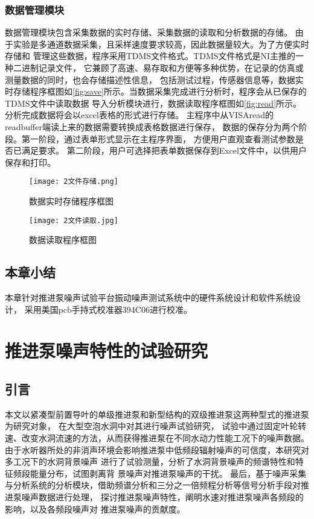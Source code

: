 \subsection{数据管理模块}
数据管理模块包含采集数据的实时存储、采集数据的读取和分析数据的存储。
由于实验是多通道数据采集，且采样速度要求较高，因此数据量较大。为了方便实时存储和
管理这些数据，程序采用TDMS文件格式。TDMS文件格式是NI主推的一种二进制记录文件，
它兼顾了高速、易存取和方便等多种优势，在记录的仿真或测量数据的同时，也会存储描述性信息，
包括测试过程，传感器信息等，数据实时存储程序框图如\autoref{fig:save}所示。当数据采集完成进行分析时，程序会从已保存的TDMS文件中读取数据
导入分析模块进行，数据读取程序框图如\autoref{fig:read}所示。分析完成数据将会以excel表格的形式进行存储。
主程序中从VISAread的readbuffer端读上来的数据需要转换成表格数据进行保存，
数据的保存分为两个阶段。第一阶段，通过表单形式显示在主程序界面，
方便用户直观查看测试参数是否已满足要求。
第二阶段，用户可选择把表单数据保存到Excel文件中，以供用户保存和打印。
\begin{figure}[htbp]
    \centering
    \texttt{[image: 2文件存储.png]}
    \caption{\label{fig:save}数据实时存储程序框图}
\end{figure}
\begin{figure}[htbp]
    \centering
    \texttt{[image: 2文件读取.jpg]}
    \caption{\label{fig:read}数据读取程序框图}
\end{figure}
\section{本章小结}
本章针对推进泵噪声试验平台振动噪声测试系统中的硬件系统设计和软件系统设计，
采用美国pcb手持式校准器394C06进行校准。

\chapter{推进泵噪声特性的试验研究}\label{ch:chapter3}
\section{引言}
本文以紧凑型前置导叶的单级推进泵和新型结构的双级推进泵这两种型式的推进泵为研究对象，
在大型空泡水洞中对其进行噪声试验研究，
试验中通过固定叶轮转速、改变水洞流速的方法，从而获得推进泵在不同水动力性能工况下的噪声数据。
由于水听器所处的非消声环境会影响推进泵中低频段辐射噪声的可信度，本研究对多工况下的水洞背景噪声
进行了试验测量，分析了水洞背景噪声的频谱特性和特征频段能量分布，试图剥离背
景噪声对推进泵噪声的干扰。
最后，基于噪声采集与分析系统的分析模块，借助频谱分析和三分之一倍频程分析等信号分析手段对推进泵噪声数据进行处理，
探讨推进泵噪声特性，阐明水速对推进泵噪声各频段的影响，以及各频段噪声对
推进泵噪声的贡献度。
